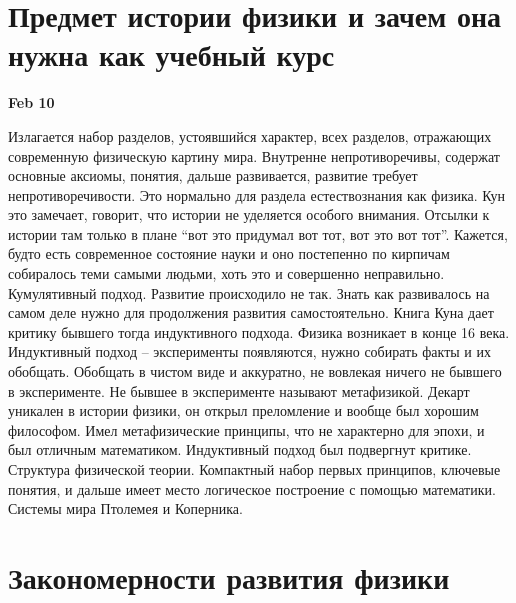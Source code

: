 \documentclass[a4paper, 12pt]{article}
\begin{document}
\tableofcontents

\clearpage

\section{Предмет истории физики и зачем она нужна как учебный курс}

\hfill\textbf{Feb 10}

Излагается набор разделов, устоявшийся характер, всех разделов, 
отражающих современную физическую картину мира. Внутренне 
непротиворечивы, содержат основные аксиомы, понятия, дальше 
развивается, развитие требует непротиворечивости. Это нормально для 
раздела естествознания как физика. Кун это замечает, говорит, что 
истории не уделяется особого внимания. Отсылки к истории там только 
в плане ``вот это придумал вот тот, вот это вот тот''. Кажется, 
будто есть современное состояние науки и оно постепенно по кирпичам 
собиралось теми самыми людьми, хоть это и совершенно неправильно. 
Кумулятивный подход. Развитие происходило не так. Знать как 
развивалось на самом деле нужно для продолжения развития 
самостоятельно. Книга Куна дает критику бывшего тогда индуктивного 
подхода. Физика возникает в конце 16 века. Индуктивный 
подход -- эксперименты появляются, нужно собирать факты и их 
обобщать. Обобщать в чистом виде и аккуратно, не вовлекая ничего не 
бывшего в эксперименте. Не бывшее в эксперименте называют 
метафизикой. Декарт уникален в истории физики, он открыл 
преломление и вообще был хорошим философом. Имел метафизические 
принципы, что не характерно для эпохи, и был отличным математиком. 
Индуктивный подход был подвергнут критике. Структура физической 
теории. Компактный набор первых принципов, ключевые понятия, 
и дальше имеет место логическое построение с помощью математики. 
Системы мира Птолемея и Коперника.


\section{Закономерности развития физики}
\end{document}
